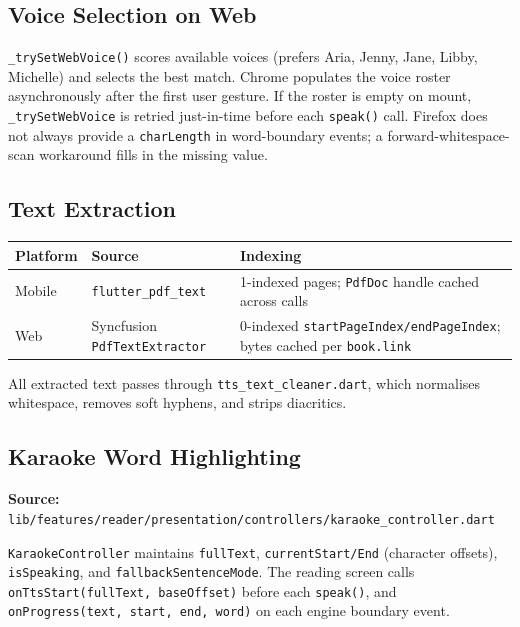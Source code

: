 \documentclass[11pt,a4paper]{article}
\begin{document}
\subsection{Voice Selection on Web}

\texttt{\_trySetWebVoice()} scores available voices (prefers Aria, Jenny, Jane, Libby,
Michelle) and selects the best match. Chrome populates the voice roster asynchronously
after the first user gesture. If the roster is empty on mount, \texttt{\_trySetWebVoice}
is retried just-in-time before each \texttt{speak()} call. Firefox does not always
provide a \texttt{charLength} in word-boundary events; a forward-whitespace-scan
workaround fills in the missing value.

\subsection{Text Extraction}

\vspace{4pt}
\begin{tabularx}{\textwidth}{@{}L{2.2cm} L{4.2cm} L{7.3cm}@{}}
  \toprule
  \textbf{Platform} & \textbf{Source} & \textbf{Indexing} \\
  \midrule
  Mobile & \texttt{flutter\_pdf\_text} & 1-indexed pages; \texttt{PdfDoc} handle
    cached across calls \\
  Web & Syncfusion \texttt{PdfTextExtractor} & 0-indexed
    \texttt{startPageIndex/endPageIndex}; bytes cached per \texttt{book.link} \\
  \bottomrule
\end{tabularx}
\vspace{2pt}

All extracted text passes through \texttt{tts\_text\_cleaner.dart}, which normalises
whitespace, removes soft hyphens, and strips diacritics.

\subsection{Karaoke Word Highlighting}

\textbf{Source:} \texttt{lib/features/reader/presentation/controllers/karaoke\_controller.dart}

\texttt{KaraokeController} maintains \texttt{fullText}, \texttt{currentStart/End}
(character offsets), \texttt{isSpeaking}, and \texttt{fallbackSentenceMode}. The reading
screen calls \texttt{onTtsStart(fullText, baseOffset)} before each \texttt{speak()},
and \texttt{onProgress(text, start, end, word)} on each engine boundary event.
\end{document}
